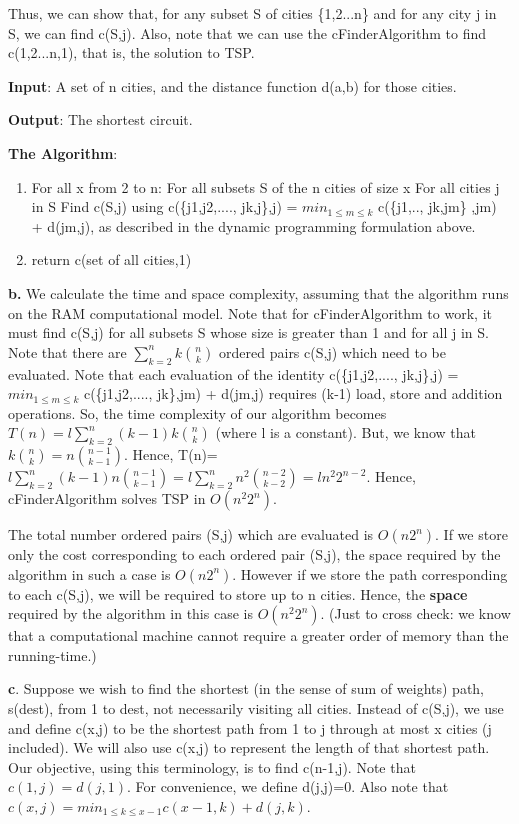 \documentclass[10pt]{article}
\begin{document}
Thus, we can show that, for any subset S of cities \{1,2...n\} and for any city j in S, we can find c(S,j). Also, note that we can use the cFinderAlgorithm to find c({1,2...n},1), that is, the solution to TSP.

\textbf{Input}: A set of n cities, and the distance function d(a,b) for those cities.

\textbf{Output}: The shortest circuit.

\textbf{The Algorithm}:

\begin{enumerate}
\item For all x from 2 to n:
\subitem For all subsets S of the n cities of size x
\subsubitem For all cities j in S
\subsubitem Find c(S,j) using c(\{j1,j2,...., jk,j\},j) = $min_{1 \leq m \leq k}$  c(\{j1,.., jk,jm\} ,jm) + d(jm,j), as described in the dynamic programming formulation above.
\item return c(set of all cities,1)
\end{enumerate}


\textbf{b.} We calculate the time and space complexity, assuming that the algorithm runs on the RAM computational model. Note that for cFinderAlgorithm to work, it must find c(S,j) for all subsets S whose size is greater than 1 and for all j in S. Note that there are $\sum_{k=2}^{n} k\binom{n}{k}$ ordered pairs c(S,j) which need to be evaluated. Note that each evaluation of the identity c(\{j1,j2,...., jk,j\},j) = $min_{1 \leq m \leq k}$ c(\{j1,j2,...., jk\},jm) + d(jm,j) requires (k-1) load, store and addition operations. So, the time complexity of our algorithm becomes $T(n)=l\sum_{k=2}^{n} (k-1)k\binom{n}{k}$ (where l is a constant). But, we know that $k\binom{n}{k}=n\binom{n-1}{k-1}$. Hence, T(n)= $l\sum_{k=2}^{n} (k-1)n\binom{n-1}{k-1} = l\sum_{k=2}^{n} n^{2}\binom{n-2}{k-2} = ln^{2}2^{n-2}$. Hence, cFinderAlgorithm solves TSP in $O(n^{2}2^{n})$.

The total number ordered pairs (S,j) which are evaluated is $O(n2^{n})$. If we store only the cost corresponding to each ordered pair (S,j), the space required by the algorithm in such a case is $O(n2^{n})$. However if we store the path corresponding to each c(S,j), we will be required to store up to n cities. Hence, the \textbf{space} required by the algorithm in this case is $O(n^{2}2^{n})$. (Just to cross check: we know that a computational machine cannot require a greater order of memory than the running-time.)

\textbf{c}. Suppose we wish to find the shortest (in the sense of sum of weights) path, s(dest), from 1 to dest, not necessarily visiting all cities. Instead of c(S,j), we use and define c(x,j) to be the shortest path from 1 to j through at most x cities (j included). We will also use c(x,j) to represent the length of that shortest path. Our objective, using this terminology, is to find c(n-1,j). Note that $c(1,j)=d(j,1)$. For convenience, we define d(j,j)=0. Also note that $c(x,j) = min_{1\leq k \leq x-1}c(x-1,k) + d(j,k)$.
\end{document}
